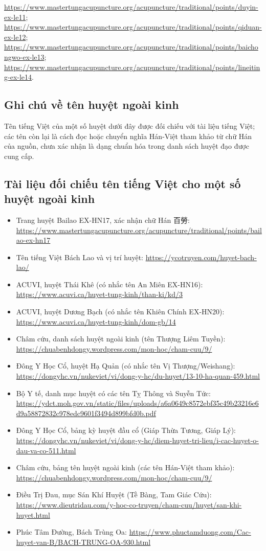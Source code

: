 \documentclass[12pt,a4paper]{article}
\begin{document}
\begin{itemize}
\url{https://www.mastertungacupuncture.org/acupuncture/traditional/points/duyin-ex-le11}; \url{https://www.mastertungacupuncture.org/acupuncture/traditional/points/qiduan-ex-le12}; \url{https://www.mastertungacupuncture.org/acupuncture/traditional/points/baichongwo-ex-le13}; \url{https://www.mastertungacupuncture.org/acupuncture/traditional/points/lineiting-ex-le14}.
\end{itemize}
\subsection*{Ghi chú về tên huyệt ngoài kinh}
Tên tiếng Việt của một số huyệt dưới đây được đối chiếu với tài liệu tiếng Việt; các tên còn lại là cách đọc hoặc chuyển nghĩa Hán-Việt tham khảo từ chữ Hán của nguồn, chưa xác nhận là dạng chuẩn hóa trong danh sách huyệt đạo được cung cấp.
\subsection*{Tài liệu đối chiếu tên tiếng Việt cho một số huyệt ngoài kinh}
\begin{itemize}
  \item Trang huyệt Bailao EX-HN17, xác nhận chữ Hán 百勞: \url{https://www.mastertungacupuncture.org/acupuncture/traditional/points/bailao-ex-hn17}
  \item Tên tiếng Việt Bách Lao và vị trí huyệt: \url{https://ycotruyen.com/huyet-bach-lao/}
  \item ACUVI, huyệt Thái Khê (có nhắc tên An Miên EX-HN16): \url{https://www.acuvi.ca/huyet-tung-kinh/than-ki/kd/3}
  \item ACUVI, huyệt Dương Bạch (có nhắc tên Khiên Chính EX-HN20): \url{https://www.acuvi.ca/huyet-tung-kinh/dom-gb/14}
  \item Châm cứu, danh sách huyệt ngoài kinh (tên Thượng Liêm Tuyền): \url{https://chuabenhdongy.wordpress.com/mon-hoc/cham-cuu/9/}
  \item Đông Y Học Cổ, huyệt Hạ Quản (có nhắc tên Vị Thượng/Weishang): \url{https://dongyhc.vn/nukeviet/vi/dong-y-hc/du-huyet/13-10-ha-quan-459.html}
  \item Bộ Y tế, danh mục huyệt có các tên Tỵ Thông và Suyễn Tức: \url{https://ydct.moh.gov.vn/static/files/uploads/a6a0649c8572ebf35c49b23216e6d9a58872832c978edc9601f3494d899bfd0b.pdf}
  \item Đông Y Học Cổ, bảng kỳ huyệt đầu cổ (Giáp Thừa Tương, Giáp Lý): \url{https://dongyhc.vn/nukeviet/vi/dong-y-hc/diem-huyet-tri-lieu/i-cac-huyet-o-dau-va-co-511.html}
  \item Châm cứu, bảng tên huyệt ngoài kinh (các tên Hán-Việt tham khảo): \url{https://chuabenhdongy.wordpress.com/mon-hoc/cham-cuu/9/}
  \item Điều Trị Đau, mục Sán Khí Huyệt (Tề Bàng, Tam Giác Cứu): \url{https://www.dieutridau.com/y-hoc-co-truyen/cham-cuu/huyet/san-khi-huyet.html}
  \item Phúc Tâm Đường, Bách Trùng Oa: \url{https://www.phuctamduong.com/Cac-huyet-van-B/BACH-TRUNG-OA-930.html}
\end{itemize}
\end{document}
